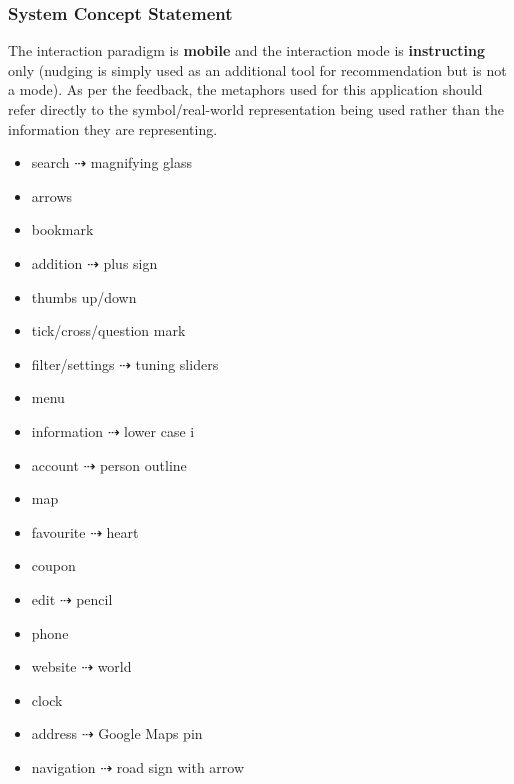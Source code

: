 \documentclass[a4 paper, 12pt]{article}
\begin{document}
        \subsubsection*{System Concept Statement}
        The interaction paradigm is \textbf{mobile} and the interaction mode is \textbf{instructing} only (nudging is simply used as an additional tool for recommendation but is not a mode). As per the feedback, the metaphors used for this application should refer directly to the symbol/real-world representation being used rather than the information they are representing.  
            \begin{multicols}{2}
                \begin{itemize}
                    \item search $\dashrightarrow$ magnifying glass
                    \item arrows 
                    \item bookmark 
                    \item addition $\dashrightarrow$ plus sign
                    \item thumbs up/down 
                    \item tick/cross/question mark 
                    \item filter/settings $\dashrightarrow$ tuning sliders 
                    \item menu
                    \item information $\dashrightarrow$ lower case i 
                    \item account $\dashrightarrow$ person outline 
                    \item map 
                    \item favourite $\dashrightarrow$ heart 
                    \item coupon
                    \item edit $\dashrightarrow$ pencil
                    \item phone
                    \item website $\dashrightarrow$ world
                    \item clock
                    \item address $\dashrightarrow$ Google Maps pin
                    \item navigation $\dashrightarrow$ road sign with arrow
                \end{itemize}
            \end{multicols}
\end{document}
